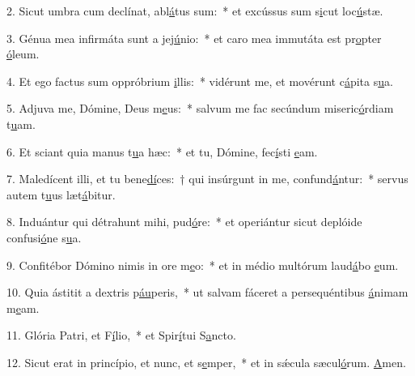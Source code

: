 2. Sicut umbra cum declínat, abl\uline{á}tus sum:~* et excússus sum s\uline{i}cut loc\uline{ú}stæ.\par 
3. Génua mea infirmáta sunt a jej\uline{ú}nio:~* et caro mea immutáta est pr\uline{o}pter \uline{ó}leum.\par 
4. Et ego factus sum oppróbrium \uline{i}llis:~* vidérunt me, et movérunt c\uline{á}pita s\uline{u}a.\par 
5. Adjuva me, Dómine, Deus m\uline{e}us:~* salvum me fac secúndum miseric\uline{ó}rdiam t\uline{u}am.\par 
6. Et sciant quia manus t\uline{u}a hæc:~* et tu, Dómine, fec\uline{í}sti \uline{e}am.\par 
7. Maledícent illi, et tu bene\uline{dí}ces:~† qui insúrgunt in me, confund\uline{á}ntur:~* servus autem t\uline{u}us læt\uline{á}bitur.\par 
8. Induántur qui détrahunt mihi, pud\uline{ó}re:~* et operiántur sicut deplóide confusi\uline{ó}ne s\uline{u}a.\par 
9. Confitébor Dómino nimis in ore m\uline{e}o:~* et in médio multórum laud\uline{á}bo \uline{e}um.\par 
10. Quia ástitit a dextris p\uline{áu}peris,~* ut salvam fáceret a persequéntibus \uline{á}nimam m\uline{e}am.\par 
11. Glória Patri, et F\uline{í}lio,~* et Spir\uline{í}tui S\uline{a}ncto.\par 
12. Sicut erat in princípio, et nunc, et s\uline{e}mper,~* et in sǽcula sæcul\uline{ó}rum. \uline{A}men.\par 
